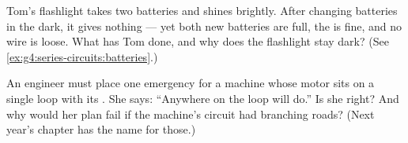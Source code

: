 \begin{exercise}[$\star\star$]\label{exo:g4:series-circuits:10}
Tom's flashlight takes two batteries and shines brightly. After
changing batteries in the dark, it gives nothing --- yet both new
batteries are full, the  is fine, and no wire is loose. What
has Tom done, and why does the flashlight stay dark? (See
\cref{ex:g4:series-circuits:batteries}.)
\end{exercise}

\begin{exercise}[$\star\star$]\label{exo:g4:series-circuits:11}
An engineer must place one emergency  for a machine
whose motor sits on a single loop with its . She says:
``Anywhere on the loop will do.'' Is she right? And why would her
plan fail if the machine's circuit had branching roads? (Next
year's chapter has the name for those.)
\end{exercise}
